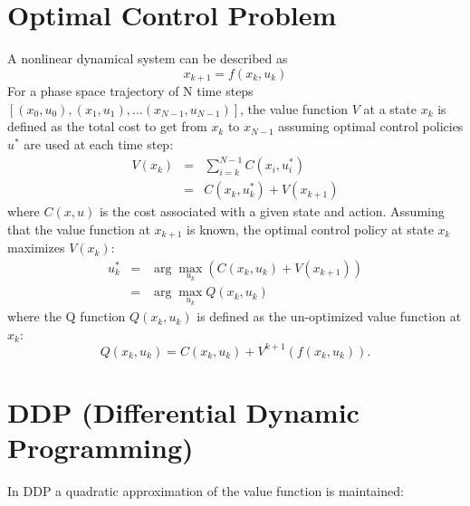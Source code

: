 \documentclass[10 pt]{article}
\begin{document}
\section*{Optimal Control Problem}
A nonlinear dynamical system can be described as
\begin{equation}
x_{k+1}=f(x_k,u_k)
\end{equation}
For a phase space trajectory of N time steps $[(x_0, u_0), (x_1, u_1), ... (x_{N-1},u_{N-1})]$, the value function $V$ at a state $x_k$ is defined as the total cost to get from $x_k$ to $x_{N-1}$ assuming optimal control policies $u^*$ are used at each time step:
\begin{eqnarray*}
V(x_k)&=&\sum_{i=k}^{N-1} C(x_i,u_i^*)\\
      &=&C(x_k,u_k^*)+V(x_{k+1})
\end{eqnarray*}
where $C(x,u)$ is the cost associated with a given state and action. Assuming that the value function at $x_{k+1}$ is known, the optimal control policy at state $x_k$ maximizes $V(x_k)$:
\begin{eqnarray}
u_k^* &=& \arg\max_{u_k} \left(C(x_k,u_k)+V(x_{k+1})\right)\\
\label{eq:solve_me}
     &=& \arg\max_{u_k} Q(x_k,u_k)
\end{eqnarray}
where the Q function $Q(x_k,u_k)$ is defined as the un-optimized value function at $x_k$:
\begin{equation}
\label{eq:Q_function}
Q(x_k,u_k)= C(x_k,u_k)+V^{k+1}(f(x_k,u_k)).
\end{equation}



\section*{DDP (Differential Dynamic Programming)}
In DDP a quadratic approximation of the value function is maintained:
\end{document}
